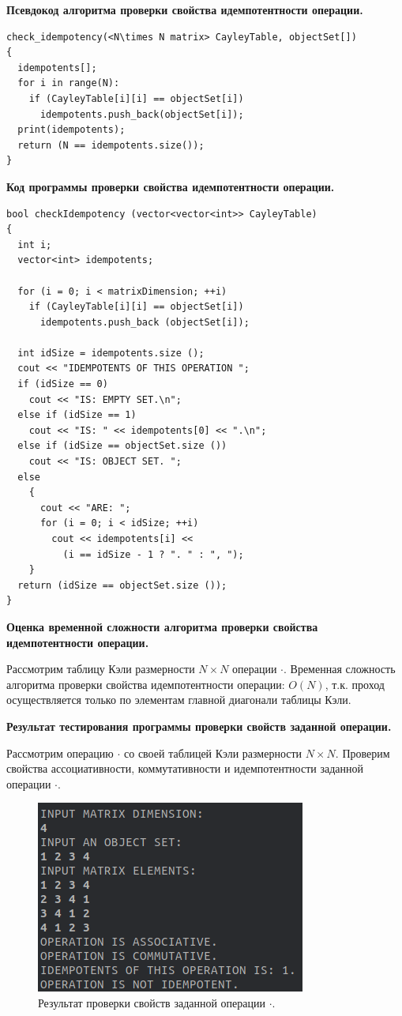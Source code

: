 \documentclass[spec, och, otchet, hidelinks]{SCWorks}
\newcommand{\tbf}[1]{\textbf{#1}}
\begin{document}
\par \tbf{Псевдокод алгоритма проверки свойства идемпотентности операции.}
\begin{lstlisting}[caption=Псевдокод алгоритма., mathescape]
check_idempotency(<N\times N matrix> CayleyTable, objectSet[])
{
  idempotents[];
  for i in range(N):
    if (CayleyTable[i][i] == objectSet[i])
      idempotents.push_back(objectSet[i]);
  print(idempotents);
  return (N == idempotents.size());
}
\end{lstlisting}

\par \tbf{Код программы проверки свойства идемпотентности операции.}
\begin{lstlisting}[caption=Код программы., mathescape]
bool checkIdempotency (vector<vector<int>> CayleyTable)
{
  int i;
  vector<int> idempotents;

  for (i = 0; i < matrixDimension; ++i)
    if (CayleyTable[i][i] == objectSet[i])
      idempotents.push_back (objectSet[i]);

  int idSize = idempotents.size ();
  cout << "IDEMPOTENTS OF THIS OPERATION ";
  if (idSize == 0)
    cout << "IS: EMPTY SET.\n";
  else if (idSize == 1)
    cout << "IS: " << idempotents[0] << ".\n";
  else if (idSize == objectSet.size ())
    cout << "IS: OBJECT SET. ";
  else
    {
      cout << "ARE: ";
      for (i = 0; i < idSize; ++i)
        cout << idempotents[i] << 
          (i == idSize - 1 ? ". " : ", ");
    }
  return (idSize == objectSet.size ());
}
\end{lstlisting}

\par \tbf{Оценка временной сложности алгоритма проверки свойства идемпотентности
  операции.}
\par Рассмотрим таблицу Кэли размерности $N\times N$ операции $\cdot$. Временная
сложность алгоритма проверки свойства идемпотентности операции: $O(N)$, т.к.
проход осуществляется только по элементам главной диагонали таблицы Кэли.

\par \tbf{Результат тестирования программы проверки свойств заданной операции.}
\par Рассмотрим операцию $\cdot$ со своей таблицей Кэли размерности $N\times N$.
Проверим свойства ассоциативности, коммутативности и идемпотентности заданной
операции $\cdot$.

\begin{figure}[h]
  \center\includegraphics[scale=0.65]{check_properties.png}
  \caption{Результат проверки свойств заданной операции $\cdot$.}
\end{figure}
\end{document}
